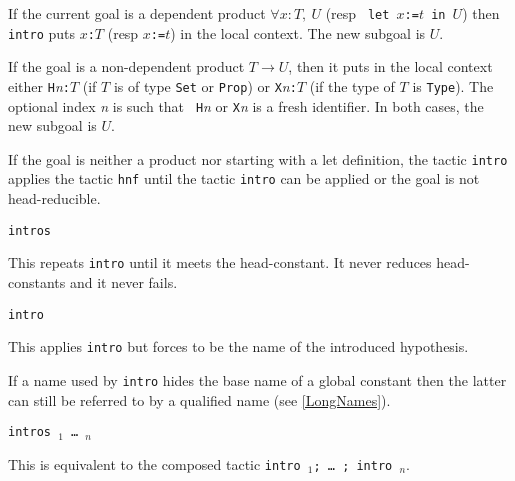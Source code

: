 \begin{coq_example*}
If the current goal is a dependent product $\forall x:T,~U$ (resp {\tt
let $x$:=$t$ in $U$}) then {\tt intro} puts {\tt $x$:$T$} (resp {\tt $x$:=$t$})
 in the local context.
The new subgoal is $U$.

If the goal is a non-dependent product $T \to U$, then it puts
in the local context either {\tt H}{\it n}{\tt :$T$} (if $T$ is of
type {\tt Set} or {\tt Prop}) or {\tt X}{\it n}{\tt :$T$} (if the type
of $T$ is {\tt Type}). The optional index {\it n} is such that {\tt
H}{\it n} or {\tt X}{\it n} is a fresh identifier.
In both cases, the new subgoal is $U$.

If the goal is neither a product nor starting with a let definition,
the tactic {\tt intro} applies the tactic {\tt hnf} until the tactic
{\tt intro} can be applied or the goal is not head-reducible.

\begin{ErrMsgs}
\item {}
\item {}
\end{ErrMsgs}

\begin{Variants}

\item {\tt intros}

  This repeats {\tt intro} until it meets the head-constant. It never reduces
  head-constants and it never fails.

\item {\tt intro {\ident}}

  This applies {\tt intro} but forces {\ident} to be the name of the
  introduced hypothesis.

  \ErrMsg {}

  \Rem If a name used by {\tt intro} hides the base name of a global
  constant then the latter can still be referred to by a qualified name
  (see \ref{LongNames}).

\item {\tt intros \ident$_1$ \dots\ \ident$_n$}

  This is equivalent to the composed tactic {\tt intro \ident$_1$; \dots\ ;
    intro \ident$_n$}.


\end{Variants}
\end{coq_example*}
